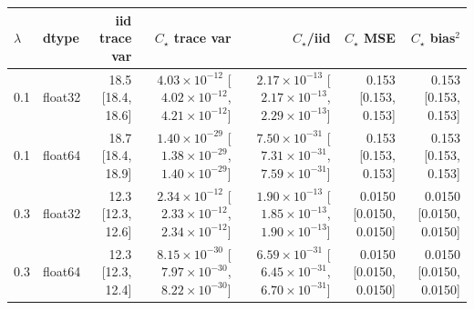 \begin{tabular}{llrrrrr}
\toprule
$\lambda$ & dtype & iid trace var & $C_\star$ trace var & $C_\star$/iid & $C_\star$ MSE & $C_\star$ bias$^2$ \\
\midrule
0.1 & float32 & 18.5 [18.4, 18.6] & $4.03\times 10^{-12}$ [$4.02\times 10^{-12}$, $4.21\times 10^{-12}$] & $2.17\times 10^{-13}$ [$2.17\times 10^{-13}$, $2.29\times 10^{-13}$] & 0.153 [0.153, 0.153] & 0.153 [0.153, 0.153] \\
0.1 & float64 & 18.7 [18.4, 18.9] & $1.40\times 10^{-29}$ [$1.38\times 10^{-29}$, $1.40\times 10^{-29}$] & $7.50\times 10^{-31}$ [$7.31\times 10^{-31}$, $7.59\times 10^{-31}$] & 0.153 [0.153, 0.153] & 0.153 [0.153, 0.153] \\
0.3 & float32 & 12.3 [12.3, 12.6] & $2.34\times 10^{-12}$ [$2.33\times 10^{-12}$, $2.34\times 10^{-12}$] & $1.90\times 10^{-13}$ [$1.85\times 10^{-13}$, $1.90\times 10^{-13}$] & 0.0150 [0.0150, 0.0150] & 0.0150 [0.0150, 0.0150] \\
0.3 & float64 & 12.3 [12.3, 12.4] & $8.15\times 10^{-30}$ [$7.97\times 10^{-30}$, $8.22\times 10^{-30}$] & $6.59\times 10^{-31}$ [$6.45\times 10^{-31}$, $6.70\times 10^{-31}$] & 0.0150 [0.0150, 0.0150] & 0.0150 [0.0150, 0.0150] \\
\bottomrule
\end{tabular}
